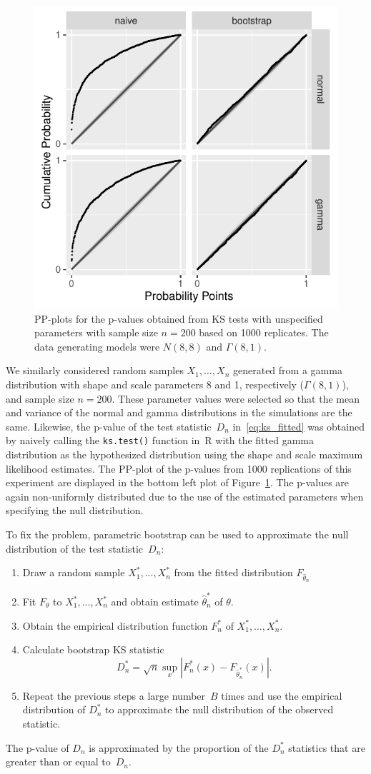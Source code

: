\documentclass[12pt, letterpaper]{article}
\begin{document}
\begin{figure}[tbp]
  \centering
  \includegraphics[width=.5\textwidth]{pp_f.pdf}
  \caption{PP-plots for the p-values obtained from KS tests with unspecified
    parameters with sample size $n = 200$ based on 1000 replicates. The data
    generating models were $N(8, 8)$ and $\Gamma(8, 1)$.
  }
  \label{fig:pp_f}
\end{figure}


We similarly considered random samples $X_1, \ldots, X_n$ 
generated from a gamma distribution with shape and scale parameters 8 and 1, 
respectively ($\Gamma(8,1)$), and sample size $n=200$. These parameter values 
were selected so that the mean and variance of the normal and gamma distributions 
in the simulations are the same. Likewise, the p-value of the test 
statistic~$D_n$ in~\eqref{eq:ks_fitted} was obtained by naively calling the
\texttt{ks.test()} function in~R with the fitted gamma distribution as the
hypothesized distribution using the shape and scale maximum likelihood 
estimates. The PP-plot of the p-values from 1000 replications of this 
experiment are displayed in the bottom left plot of Figure~\ref{fig:pp_f}. The
p-values are again non-uniformly distributed due to the use of the 
estimated parameters when specifying the null distribution.


To fix the problem, parametric bootstrap can be used to approximate the null
distribution of the test statistic~$D_n$:
\begin{enumerate}
\item
  Draw a random sample $X_1^*,...,X_n^*$ from the fitted distribution
  $F_{\hat\theta_n}$
\item
  Fit $F_\theta$ to $X_1^*,...,X_n^*$ and obtain estimate 
	$\hat\theta_n^*$ of $\theta$.
\item
  Obtain the empirical distribution function $F_n^*$ of
  $X_1^*, \ldots,  X_n^*$.
\item
  Calculate bootstrap KS statistic
  \[
    D_n^* = \sqrt{n} \sup_x | F_n^* (x)- F_{\hat\theta_n^*}(x) |.
  \]
\item
  Repeat the previous steps a large number~$B$ times and use the empirical
  distribution of $D_n^*$ to approximate the null distribution of the observed
  statistic.
\end{enumerate}
The p-value of $D_n$ is approximated by the proportion of the $D_n^*$ 
statistics that are greater than or equal to~$D_n$.
\end{document}
